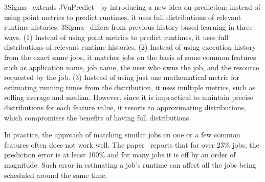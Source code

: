 3Sigma~\cite{3Sigma} 
extends JVuPredict~\cite{jamiasvu}
by introducing a new idea on prediction: instead of using point
metrics to predict runtimes, it uses full distributions of relevant
runtime histories.
3Sigma~\cite{3Sigma} differs from previous history-based learning in three ways.
(1) Instead of using point metrics to predict runtimes, it uses full
distributions of relevant runtime histories.
(2) Instead of using execution history from the
exact same jobs, it matches jobs on the basis of some common features such as
application name, job name, the user who owns the job, and the resource requested by the
job.
%
(3) Instead of using just one mathematical metric for
estimating running times from the distribution, it uses multiple metrics, such as
rolling average and median.
\fi
However, since it is impractical to maintain precise distributions for each
feature value, it resorts to approximating distributions, which
compromises the benefits of having full distributions. 

In practice, the approach of matching similar jobs on 
one or a few common features often does not work well.  The
paper~\cite{3Sigma} reports that for over 23\% jobs, the prediction
error is at least 100\% and for many jobs it is off by an order of
magnitude. Such error in estimating a job's
runtime can affect all the jobs being scheduled around the same
time.


